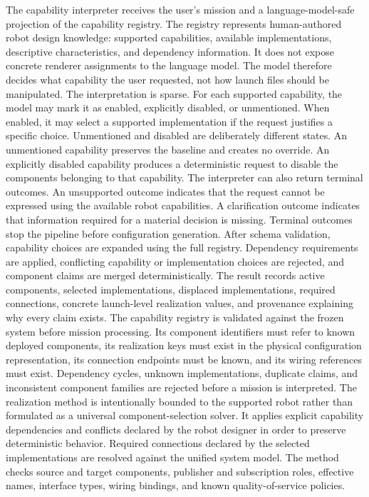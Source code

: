 The capability interpreter receives the user's mission and a language-model-safe projection of the capability registry. The registry represents human-authored robot design knowledge: supported capabilities, available implementations, descriptive characteristics, and dependency information. It does not expose concrete renderer assignments to the language model. The model therefore decides what capability the user requested, not how launch files should be manipulated.
The interpretation is sparse. For each supported capability, the model may mark it as enabled, explicitly disabled, or unmentioned. When enabled, it may select a supported implementation if the request justifies a specific choice. Unmentioned and disabled are deliberately different states. An unmentioned capability preserves the baseline and creates no override. An explicitly disabled capability produces a deterministic request to disable the components belonging to that capability.
The interpreter can also return terminal outcomes. An unsupported outcome indicates that the request cannot be expressed using the available robot capabilities. A clarification outcome indicates that information required for a material decision is missing. Terminal outcomes stop the pipeline before configuration generation.
After schema validation, capability choices are expanded using the full registry. Dependency requirements are applied, conflicting capability or implementation choices are rejected, and component claims are merged deterministically. The result records active components, selected implementations, displaced implementations, required connections, concrete launch-level realization values, and provenance explaining why every claim exists.
The capability registry is validated against the frozen system before mission processing. Its component identifiers must refer to known deployed components, its realization keys must exist in the physical configuration representation, its connection endpoints must be known, and its wiring references must exist. Dependency cycles, unknown implementations, duplicate claims, and inconsistent component families are rejected before a mission is interpreted.
The realization method is intentionally bounded to the supported robot rather than formulated as a universal component-selection solver. It applies explicit capability dependencies and conflicts declared by the robot designer in order to preserve deterministic behavior. 
Required connections declared by the selected implementations are resolved against the unified system model. The method checks source and target components, publisher and subscription roles, effective names, interface types, wiring bindings, and known quality-of-service policies.
